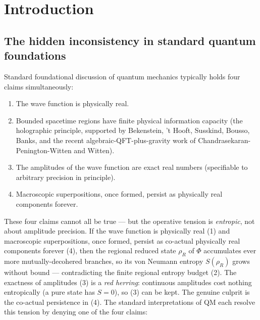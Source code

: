 \documentclass[11pt,a4paper]{article}
\begin{document}
\tableofcontents
\newpage


\section{Introduction}

\subsection{The hidden inconsistency in standard quantum foundations}

Standard foundational discussion of quantum mechanics typically holds four claims simultaneously:

\begin{enumerate}
  \item The wave function is physically real.
  \item Bounded spacetime regions have finite physical information capacity (the holographic principle, supported by Bekenstein, 't Hooft, Susskind, Bousso, Banks, and the recent algebraic-QFT-plus-gravity work of Chandrasekaran-Penington-Witten and Witten).
  \item The amplitudes of the wave function are exact real numbers (specifiable to arbitrary precision in principle).
  \item Macroscopic superpositions, once formed, persist as physically real components forever.
\end{enumerate}

These four claims cannot all be true — but the operative tension is \emph{entropic}, not about amplitude precision. If the wave function is physically real (1) and macroscopic superpositions, once formed, persist as co-actual physically real components forever (4), then the regional reduced state $\rho_R$ of $\Phi$ accumulates ever more mutually-decohered branches, so its von Neumann entropy $S(\rho_R)$ grows without bound — contradicting the finite regional entropy budget (2). The exactness of amplitudes (3) is a \emph{red herring}: continuous amplitudes cost nothing entropically (a pure state has $S=0$), so (3) can be kept. The genuine culprit is the co-actual persistence in (4). The standard interpretations of QM each resolve this tension by denying one of the four claims:
\end{document}
